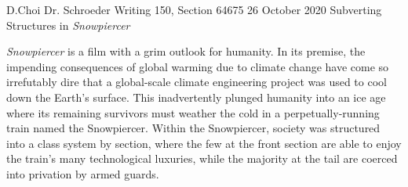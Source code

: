 \documentclass[12pt, letterpaper]{article}
\begin{document}
\begin{mla}
	{D.}{Choi}
	{Dr. Schroeder}
	{Writing 150, Section 64675}
	{26 October 2020}
	{Subverting Structures in \textit{Snowpiercer}}


\textit{Snowpiercer} is a film with a grim outlook for humanity. In its
premise, the impending consequences of global warming due to climate change
have come so irrefutably dire that a global-scale climate engineering project
was used to cool down the Earth's surface. This inadvertently plunged humanity
into an ice age where its remaining survivors must weather the cold in a
perpetually-running train named the Snowpiercer. Within the Snowpiercer,
society was structured into a class system by section, where the few at the
front section are able to enjoy the train's many technological luxuries, while
the majority at the tail are coerced into privation by armed guards.


\begin{workscited}
\end{workscited}


\end{mla}
\end{document}
